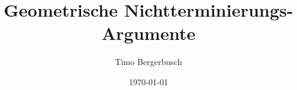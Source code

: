 \documentclass{beamer}
\title{Geometrische Nichtterminierungs-Argumente}
\author{Timo Bergerbusch}
\date{\myformat\today}
\begin{document}
\maketitle
\frame{\tableofcontents}






\end{document}
